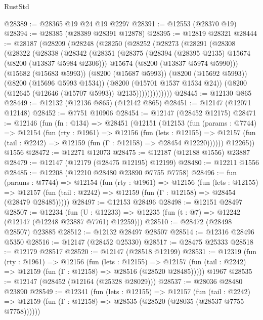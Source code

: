 \begin{lexlean}{RustStd}
\begin{coremodule}
@28389 := @28365 @19 @24 @19 @2297
@28391 := @12553 (@28370 @19)
@28394 := @28385 (@28389 @28391 @12878)
@28395 := @12819 @28321
@28444 := @28187
    (@28209
      (@28248
        (@28250
          (@28252
            (@28273
              (@28291
                (@28308
                  (@28322
                    (@28338
                      (@28342
                        (@28351
                          (@28375
                            (@28394 (@28395 @2135) @15674 (@8200 (@13837 @5984 @2306)))
                            @15674
                            (@8200 (@13837 @5974 @5990)))
                          (@15682 (@15683 @5993))
                          (@8200 (@15687 @5993))
                          (@8200 (@15692 @5993))
                          (@8200 (@15696 @5993 @1534))
                          (@8200 (@15701 @1537 @1534 @24))
                          (@8200 (@12645 (@12646 (@15707 @5993)) @2135)))))))))))))
@28445 := @12130 @865
@28449 := @12132 (@12136 @865) (@12142 @865)
@28451 := @12147 (@12071 @12148)
@28452 := @7751 @10906
@28454 := @12147 (@28452 @12175)
@28471 := @12146
    (fun (fn : @134) =>
    @28451
      (@12151
        (@12153
          (fun (params : @7744) =>
          @12154
            (fun (rty : @1961) =>
            @12156
              (fun (lets : @12155) =>
              @12157 (fun (tail : @2242) => @12159 (fun (Γ : @12158) => @28454 @12220))))))
        @12265))
    @1556
@28472 := @12271 @12073
@28475 := @12187 (@12188 @1556) @23887
@28479 := @12147 (@12179 (@28475 @12195) @12199)
@28480 := @12211 @1556
@28485 := @12208 (@12210 @28480 @23890 @7755 @7758)
@28496 := fun (params : @7744) =>
  @12154
    (fun (rty : @1961) =>
    @12156
      (fun (lets : @12155) =>
      @12157 (fun (tail : @2242) => @12159 (fun (Γ : @12158) => @28454 (@28479 @28485)))))
@28497 := @12153 @28496
@28498 := @12151 @28497
@28507 := @12234
    (fun (U : @12233) => @12235 (fun (t : @7) => @12242 (@12147 (@12248 @23887 @7761) @12259)))
@28510 := @28472 (@28498 @28507) @23885
@28512 := @12132 @28497 @28507
@28514 := @12316 @28496 @5350
@28516 := @12147 (@28452 @25330)
@28517 := @28475 @25333
@28518 := @12179 @28517
@28520 := @12147 (@28518 @12199)
@28531 := @12319
    (fun (rty : @1961) =>
    @12156
      (fun (lets : @12155) =>
      @12157 (fun (tail : @2242) => @12159 (fun (Γ : @12158) => @28516 (@28520 @28485)))))
    @1967
@28535 := @12147 (@28452 (@12164 (@25328 @28029)))
@28537 := @28036 @28480 @23890
@28549 := @12341
    (fun (lets : @12155) =>
    @12157
      (fun (tail : @2242) =>
      @12159 (fun (Γ : @12158) => @28535 (@28520 (@28035 (@28537 @7755 @7758))))))

\end{coremodule}
\end{lexlean}
